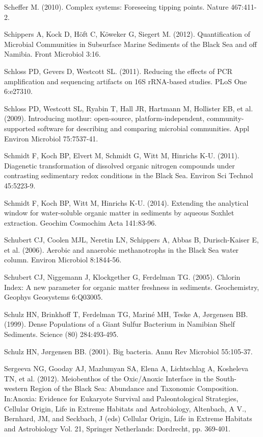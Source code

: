 Scheffer M. (2010). Complex systems: Foreseeing tipping points. Nature 467:411-2.

Schippers A, Kock D, H\"oft C, K\"oweker G, Siegert M. (2012). Quantification of Microbial Communities in Subsurface Marine Sediments of the Black Sea and off Namibia. Front Microbiol 3:16.

Schloss PD, Gevers D, Westcott SL. (2011). Reducing the effects of PCR amplification and sequencing artifacts on 16S rRNA-based studies. PLoS One 6:e27310.

Schloss PD, Westcott SL, Ryabin T, Hall JR, Hartmann M, Hollister EB, et al. (2009). Introducing mothur: open-source, platform-independent, community-supported software for describing and comparing microbial communities. Appl Environ Microbiol 75:7537-41.

Schmidt F, Koch BP, Elvert M, Schmidt G, Witt M, Hinrichs K-U. (2011). Diagenetic transformation of dissolved organic nitrogen compounds under contrasting sedimentary redox conditions in the Black Sea. Environ Sci Technol 45:5223-9.

Schmidt F, Koch BP, Witt M, Hinrichs K-U. (2014). Extending the analytical window for water-soluble organic matter in sediments by aqueous Soxhlet extraction. Geochim Cosmochim Acta 141:83-96.

Schubert CJ, Coolen MJL, Neretin LN, Schippers A, Abbas B, Durisch-Kaiser E, et al. (2006). Aerobic and anaerobic methanotrophs in the Black Sea water column. Environ Microbiol 8:1844-56.

Schubert CJ, Niggemann J, Klockgether G, Ferdelman TG. (2005). Chlorin Index: A new parameter for organic matter freshness in sediments. Geochemistry, Geophys Geosystems 6:Q03005.

Schulz HN, Brinkhoff T, Ferdelman TG, Mariné MH, Teske A, J{\o}rgensen BB. (1999). Dense Populations of a Giant Sulfur Bacterium in Namibian Shelf Sediments. Science (80) 284:493-495.

Schulz HN, J{\o}rgensen BB. (2001). Big bacteria. Annu Rev Microbiol 55:105-37.

Sergeeva NG, Gooday AJ, Mazlumyan SA, Elena A, Lichtschlag A, Kosheleva TN, et al. (2012). Meiobenthos of the Oxic/Anoxic Interface in the South- western Region of the Black Sea: Abundance and Taxonomic Composition. In:Anoxia: Evidence for Eukaryote Survival and Paleontological Strategies, Cellular Origin, Life in Extreme Habitats and Astrobiology, Altenbach, A V., Bernhard, JM, and Seckbach, J (eds) Cellular Origin, Life in Extreme Habitats and Astrobiology Vol. 21, Springer Netherlands: Dordrecht, pp. 369-401.

